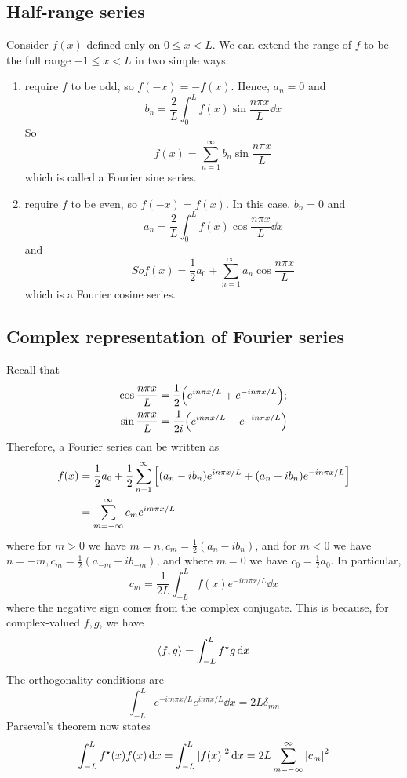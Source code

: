 \subsection{Half-range series}
Consider \( f(x) \) defined only on \( 0 \leq x < L \).
We can extend the range of \( f \) to be the full range \( -1 \leq x < L \) in two simple ways:
\begin{enumerate}
	\item require \( f \) to be odd, so \( f(-x) = -f(x) \).
	      Hence, \( a_n = 0 \) and
	      \[
		      b_n = \frac{2}{L} \int_0^L f(x) \sin \frac{n \pi x}{L} \dd{x}
	      \]
	      So
	      \[
		      f(x) = \sum_{n=1}^\infty b_n \sin \frac{n\pi x}{L}
	      \]
	      which is called a Fourier sine series.
	\item require \( f \) to be even, so \( f(-x) = f(x) \).
	      In this case, \( b_n = 0 \) and
	      \[
		      a_n = \frac{2}{L} \int_0^L f(x) \cos \frac{n \pi x}{L} \dd{x}
	      \]
	      and
	      \[
		      So f(x) = \frac{1}{2}a_0 + \sum_{n=1}^\infty a_n \cos \frac{n\pi x}{L}
	      \]
	      which is a Fourier cosine series.
\end{enumerate}

\subsection{Complex representation of Fourier series}
Recall that
\begin{align*}
	\cos \frac{n \pi x}{L} & = \frac{1}{2}\qty(e^{i n \pi x / L} + e^{-i n \pi x / L}); \\
	\sin \frac{n \pi x}{L} & = \frac{1}{2i}\qty(e^{i n \pi x / L} - e^{-i n \pi x / L})
\end{align*}
Therefore, a Fourier series can be written as
\begin{align*}
	f(x) & = \frac{1}{2} a_0 + \frac{1}{2} \sum_{n=1}^\infty \qty[ (a_n - i b_n) e^{i n \pi x / L} + (a_n + i b_n) e^{-i n \pi x / L} ] \\
	     & = \sum_{m=-\infty}^\infty c_m e^{i m \pi x / L}
\end{align*}
where for \( m > 0 \) we have \( m=n, c_m = \frac{1}{2}(a_n - ib_n) \), and for \( m < 0 \) we have \( n = -m, c_m = \frac{1}{2}(a_{-m} + ib_{-m}) \), and where \( m = 0 \) we have \( c_0 = \frac{1}{2} a_0 \).
In particular,
\[
	c_m = \frac{1}{2L} \int_{-L}^L f(x) e^{-i m \pi x / L} \dd{x}
\]
where the negative sign comes from the complex conjugate.
This is because, for complex-valued \( f, g \), we have
\[
	\left\langle{f,g}\right\rangle = \int_{-L}^L f^\star g \dd{x}
\]
The orthogonality conditions are
\[
	\int_{-L}^L e^{-i m \pi x / L} e^{i n \pi x / L} \dd{x} = 2L \delta_{mn}
\]
Parseval's theorem now states
\[
	\int_{-L}^L f^\star(x) f(x) \dd{x} = \int_{-L}^L \abs{f(x)}^2 \dd{x} = 2L \sum_{m=-\infty}^\infty \abs{c_m}^2
\]

